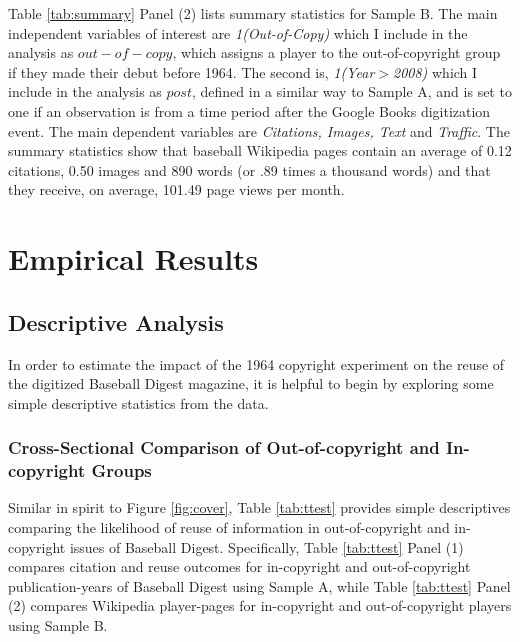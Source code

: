 \documentclass[11pt]{article}
\begin{document}
Table \ref{tab:summary} Panel (2) lists summary statistics for Sample B. The main independent variables of interest are \emph{1(Out-of-Copy)} which I include in the analysis as $out-of-copy$, which assigns a player to the out-of-copyright group if they made their debut before 1964. The second is, \emph{1(Year$>$2008)} which I include in the analysis as $post$, defined in a similar way to Sample A, and is set to one if an observation is from a time period after the Google Books digitization event. The main dependent variables are \emph{Citations, Images, Text} and \emph{Traffic}. The summary statistics show that baseball Wikipedia pages contain an average of 0.12 citations, 0.50 images and 890 words (or .89 times a thousand words) and that they receive, on average, 101.49 page views per month. 

\section{Empirical Results}
\label{sec:baseline}







\subsection{Descriptive Analysis}

In order to estimate the impact of the 1964 copyright experiment on the reuse of the digitized Baseball Digest magazine, it is helpful to begin by exploring some simple descriptive statistics from the data.

\subsubsection{Cross-Sectional Comparison of Out-of-copyright and In-copyright Groups}

Similar in spirit to Figure \ref{fig:cover}, Table \ref{tab:ttest} provides simple descriptives comparing the likelihood of reuse of information in out-of-copyright and in-copyright issues of Baseball Digest. Specifically, Table \ref{tab:ttest} Panel (1) compares citation and reuse outcomes for in-copyright and out-of-copyright publication-years of Baseball Digest using Sample A, while Table \ref{tab:ttest} Panel (2) compares Wikipedia player-pages for in-copyright and out-of-copyright players using Sample B.
\end{document}
